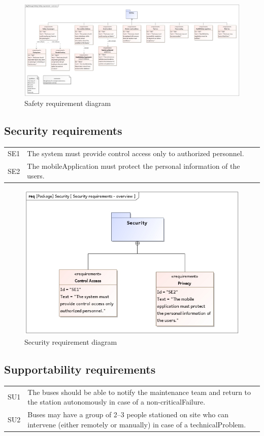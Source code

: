 \documentclass[a4paper]{article}
\begin{document}
\begin{figure}
	\centering
	\includegraphics[width=\textwidth]{req-safety.jpg}
	\caption{Safety requirement diagram}%
	\label{fig:req-safety}
\end{figure}

\subsection{Security requirements}
\begin{tabularx}{\textwidth}{p{.75cm} X}
	SE1 & The system must provide control access only to \gls{authorized}
	      personnel. \\

	SE2 & The \gls{mobileApplication} must protect the personal information
	      of the users. \\
\end{tabularx}

\begin{figure}
	\centering
	\includegraphics[width=.75\textwidth]{req-security.jpg}
	\caption{Security requirement diagram}%
	\label{fig:req-security}
\end{figure}

\subsection{Supportability requirements}
\begin{tabularx}{\textwidth}{p{.75cm} X}
	SU1 & The buses should be able to notify the maintenance team and return
	      to the \gls{station} \gls{autonomous}ly in case of a
	      \gls{non-criticalFailure}. \\

	SU2 & Buses may have a group of 2–3 people \gls{station}ed on \gls{site}
	      who can intervene (either remotely or manually) in case of a
	      \gls{technicalProblem}. \\
\end{tabularx}
\end{document}
